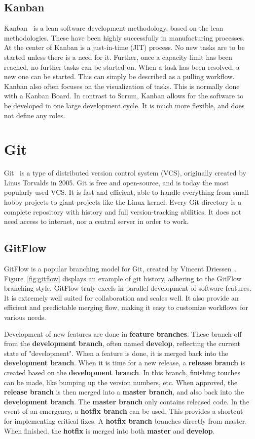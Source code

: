 \subsection{Kanban}
Kanban~\cite{kanban} is a lean software development methodology, based on the lean methodologies. These have been highly successfully in manufacturing processes. At the center of Kanban is a just-in-time (JIT) process. No new tasks are to be started unless there is a need for it. Further, once a capacity limit has been reached, no further tasks can be started on. When a task has been resolved, a new one can be started. This can simply be described as a pulling workflow. Kanban also often focuses on the visualization of tasks. This is normally done with a Kanban Board. In contrast to Scrum, Kanban allows for the software to be developed in one large development cycle. It is much more flexible, and does not define any roles.

\section{Git}
Git~\cite{git} is a type of distributed version control system (VCS), originally created by Linus Torvalds in 2005. Git is free and open-source, and is today the most popularly used VCS. It is fast and efficient, able to handle everything from small hobby projects to giant projects like the Linux kernel. Every Git directory is a complete repository with history and full version-tracking abilities. It does not need access to internet, nor a central server in order to work.

\subsection{GitFlow}
\label{sec:theory-gitflow}
GitFlow is a popular branching model for Git, created by Vincent Driessen~\cite{gitflow}. Figure~\ref{fig:gitflow} displays an example of git history, adhering to the GitFlow branching style. GitFlow truly excels in parallel development of software features. It is extremely well suited for collaboration and scales well. It also provide an efficient and predictable merging flow, making it easy to customize workflows for various needs.

Development of new features are done in \textbf{feature branches}. These branch off from the \textbf{development branch}, often named \textbf{develop}, reflecting the current state of "development". When a feature is done, it is merged back into the \textbf{development branch}. When it is time for a new release, a \textbf{release branch} is created based on the \textbf{development branch}. In this branch, finishing touches can be made, like bumping up the version numbers, etc. When approved, the \textbf{release branch} is then merged into a \textbf{master branch}, and also back into the \textbf{development branch}. The \textbf{master branch} only contains released code. In the event of an emergency, a \textbf{hotfix branch} can be used. This provides a shortcut for implementing critical fixes. A \textbf{hotfix branch} branches directly from master. When finished, the \textbf{hotfix} is merged into both \textbf{master} and \textbf{develop}.

